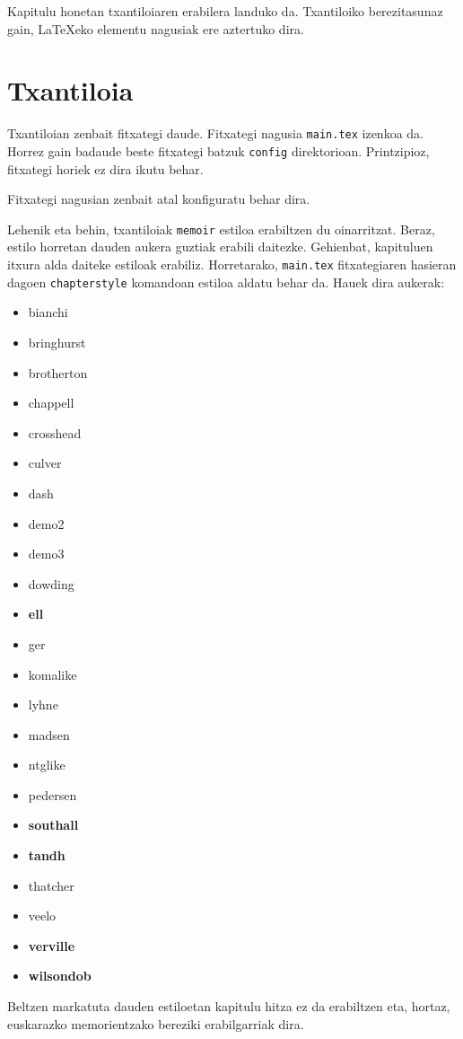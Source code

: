 Kapitulu honetan txantiloiaren erabilera landuko da. Txantiloiko berezitasunaz gain, \LaTeX eko elementu nagusiak ere aztertuko dira. 

\section{Txantiloia}

Txantiloian zenbait fitxategi daude. Fitxategi nagusia \texttt{main.tex} izenkoa da. Horrez gain badaude beste fitxategi batzuk \texttt{config} direktorioan. Printzipioz, fitxategi horiek ez dira ikutu behar.

Fitxategi nagusian zenbait atal konfiguratu behar dira.

Lehenik eta behin, txantiloiak \texttt{memoir} estiloa erabiltzen du oinarritzat. Beraz, estilo horretan dauden aukera guztiak erabili daitezke. Gehienbat, kapituluen itxura alda daiteke estiloak erabiliz. Horretarako, \texttt{main.tex} fitxategiaren hasieran dagoen \texttt{chapterstyle} komandoan estiloa aldatu behar da. Hauek dira aukerak:
\begin{itemize}
	\item bianchi
	\item bringhurst
	\item brotherton
	\item chappell
	\item crosshead
	\item culver
	\item dash
	\item demo2
	\item demo3
	\item dowding
	\item \textbf{ell}
	\item ger
	\item komalike
	\item lyhne
	\item madsen
	\item ntglike
	\item pedersen
	\item \textbf{southall}
	\item \textbf{tandh}
	\item thatcher
	\item veelo
	\item \textbf{verville}
	\item \textbf{wilsondob}
\end{itemize}

Beltzen markatuta dauden estiloetan kapitulu hitza ez da erabiltzen eta, hortaz, euskarazko memorientzako bereziki erabilgarriak dira.

